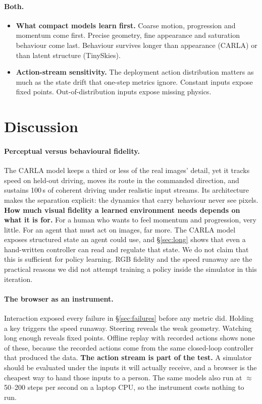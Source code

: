 \documentclass[11pt]{article}
\begin{document}
\paragraph{Both.}
\begin{itemize}
  \item \textbf{What compact models learn first.} Coarse motion, progression and momentum come first. Precise geometry, fine appearance and saturation behaviour come last. Behaviour survives longer than appearance (CARLA) or than latent structure (TinySkies).
  \item \textbf{Action-stream sensitivity.} The deployment action distribution matters as much as the state drift that one-step metrics ignore. Constant inputs expose fixed points. Out-of-distribution inputs expose missing physics.
\end{itemize}

\section{Discussion}
\label{sec:discussion}

\paragraph{Perceptual versus behavioural fidelity.} The CARLA model keeps a third or less of the real images' detail, yet it tracks speed on held-out driving, moves its route in the commanded direction, and sustains 100\,s of coherent driving under realistic input streams. Its architecture makes the separation explicit: the dynamics that carry behaviour never see pixels. \textbf{How much visual fidelity a learned environment needs depends on what it is for.} For a human who wants to feel momentum and progression, very little. For an agent that must act on images, far more. The CARLA model exposes structured state an agent could use, and \S\ref{sec:long} shows that even a hand-written controller can read and regulate that state. We do not claim that this is sufficient for policy learning. RGB fidelity and the speed runaway are the practical reasons we did not attempt training a policy inside the simulator in this iteration.

\paragraph{The browser as an instrument.} Interaction exposed every failure in \S\ref{sec:failures} before any metric did. Holding a key triggers the speed runaway. Steering reveals the weak geometry. Watching long enough reveals fixed points. Offline replay with recorded actions shows none of these, because the recorded actions come from the same closed-loop controller that produced the data. \textbf{The action stream is part of the test.} A simulator should be evaluated under the inputs it will actually receive, and a browser is the cheapest way to hand those inputs to a person. The same models also run at $\approx$50--200 steps per second on a laptop CPU, so the instrument costs nothing to run.
\end{document}
